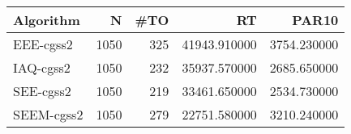 \begin{tabular}{lrrrr}
\toprule
Algorithm & N & #TO & RT & PAR10 \\
\midrule
EEE-cgss2 & 1050 & 325 & 41943.910000 & 3754.230000 \\
IAQ-cgss2 & 1050 & 232 & 35937.570000 & 2685.650000 \\
SEE-cgss2 & 1050 & 219 & 33461.650000 & 2534.730000 \\
SEEM-cgss2 & 1050 & 279 & 22751.580000 & 3210.240000 \\
\bottomrule
\end{tabular}
